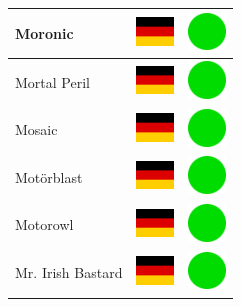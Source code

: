 \documentclass[12pt, a4paper, twoside]{report}
\begin{document}
\begin{center}
\begin{longtable}{|p{5cm}|p{2cm}|p{2cm}|}
Moronic & \includegraphics[width=1cm]{4x3/de} & \includegraphics[width=1cm]{likes/y} \\ \hline
Mortal Peril & \includegraphics[width=1cm]{4x3/de} & \includegraphics[width=1cm]{likes/y} \\ \hline
Mosaic & \includegraphics[width=1cm]{4x3/de} & \includegraphics[width=1cm]{likes/y} \\ \hline
Motörblast & \includegraphics[width=1cm]{4x3/de} & \includegraphics[width=1cm]{likes/y} \\ \hline
Motorowl & \includegraphics[width=1cm]{4x3/de} & \includegraphics[width=1cm]{likes/y} \\ \hline
Mr. Irish Bastard & \includegraphics[width=1cm]{4x3/de} & \includegraphics[width=1cm]{likes/y} \\ \hline

\end{longtable}
\end{center}
\end{document}
